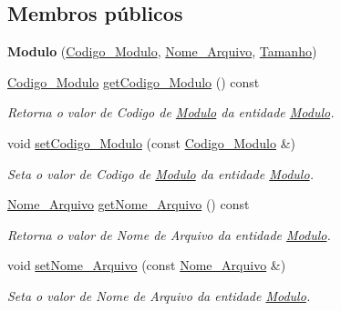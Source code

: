 \subsection*{\-Membros públicos}
\begin{DoxyCompactItemize}
\item 
\hypertarget{class_modulo_ad4dc51b22b8bd726070b683fce87fa52}{
{\bfseries \-Modulo} (\hyperlink{class_codigo___modulo}{\-Codigo\-\_\-\-Modulo}, \hyperlink{class_nome___arquivo}{\-Nome\-\_\-\-Arquivo}, \hyperlink{class_tamanho}{\-Tamanho})}
\label{class_modulo_ad4dc51b22b8bd726070b683fce87fa52}

\item 
\hyperlink{class_codigo___modulo}{\-Codigo\-\_\-\-Modulo} \hyperlink{class_modulo_a966939d6761114d5030ca10c816302ac}{get\-Codigo\-\_\-\-Modulo} () const 
\begin{DoxyCompactList}\small\item\em \-Retorna o valor de \-Codigo de \hyperlink{class_modulo}{\-Modulo} da entidade \hyperlink{class_modulo}{\-Modulo}. \end{DoxyCompactList}\item 
void \hyperlink{class_modulo_a8b41e4725c45aa47b5454008f517c392}{set\-Codigo\-\_\-\-Modulo} (const \hyperlink{class_codigo___modulo}{\-Codigo\-\_\-\-Modulo} \&)
\begin{DoxyCompactList}\small\item\em \-Seta o valor de \-Codigo de \hyperlink{class_modulo}{\-Modulo} da entidade \hyperlink{class_modulo}{\-Modulo}. \end{DoxyCompactList}\item 
\hyperlink{class_nome___arquivo}{\-Nome\-\_\-\-Arquivo} \hyperlink{class_modulo_af4662253c0b78f248b02e3925a5d102c}{get\-Nome\-\_\-\-Arquivo} () const 
\begin{DoxyCompactList}\small\item\em \-Retorna o valor de \-Nome de \-Arquivo da entidade \hyperlink{class_modulo}{\-Modulo}. \end{DoxyCompactList}\item 
void \hyperlink{class_modulo_a52d8354c7eb434f05ea76fbbcf715f9b}{set\-Nome\-\_\-\-Arquivo} (const \hyperlink{class_nome___arquivo}{\-Nome\-\_\-\-Arquivo} \&)
\begin{DoxyCompactList}\small\item\em \-Seta o valor de \-Nome de \-Arquivo da entidade \hyperlink{class_modulo}{\-Modulo}. \end{DoxyCompactList}\item 

\end{DoxyCompactItemize}
